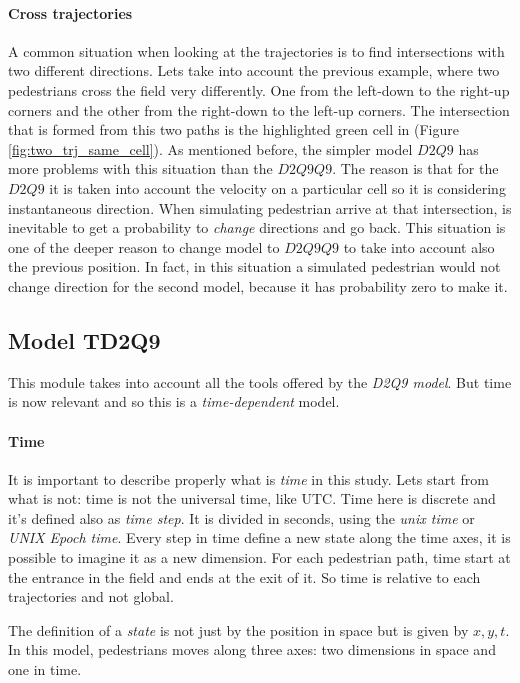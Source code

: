 \documentclass[class=article, crop=false]{standalone}
\begin{document}
\paragraph{Cross trajectories}
A common situation when looking at the trajectories is to find intersections with two different directions.
Lets take into account the previous example, where two pedestrians cross the field very differently.
One from the left-down to the right-up corners and the other from the right-down to the left-up corners.
The intersection that is formed from this two paths is the highlighted green cell in (Figure \ref{fig:two_trj_same_cell}).
As mentioned before, the simpler model $D2Q9$ has more problems with this situation than the $D2Q9Q9$.
The reason is that for the $D2Q9$ it is taken into account the velocity on a particular cell so it is considering instantaneous direction. 
When simulating pedestrian arrive at that intersection, is inevitable to get a probability to \emph{change} directions and go back.
This situation is one of the deeper reason to change model to $D2Q9Q9$ to take into account also the previous position.
In fact, in this situation a simulated pedestrian would not change direction for the second model, because it has probability zero to make it.

\FloatBarrier
\subsection{Model TD2Q9}
This module takes into account all the tools offered by the \emph{D2Q9 model}.
But time is now relevant and so this is a \emph{time-dependent} model.

\paragraph{Time}
It is important to describe properly what is \emph{time} in this study.
Lets start from what is not: time is not the universal time, like UTC.
Time here is discrete and it's defined also as \emph{time step}.
It is divided in seconds, using the \emph{unix time} or \emph{UNIX Epoch time}.
Every step in time define a new state along the time axes, it is possible to imagine it as a new dimension.
For each pedestrian path, time start at the entrance in the field and ends at the exit of it.
So time is relative to each trajectories and not global.

The definition of a \emph{state} is not just by the position in space but is given by $x, y, t$.
In this model, pedestrians moves along three axes: two dimensions in space and one in time.
\end{document}
